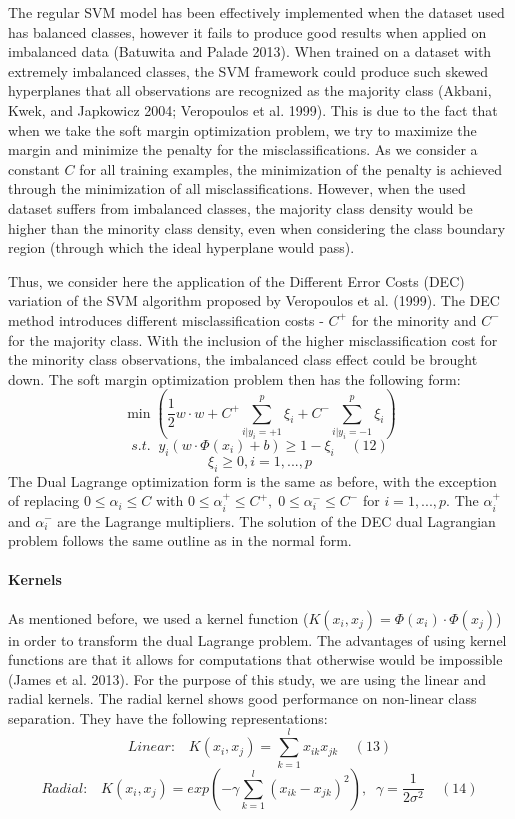 \documentclass[12pt,]{article}
\let\oldparagraph\paragraph
\renewcommand{\paragraph}[1]{\oldparagraph{#1}\mbox{}}
\begin{document}
The regular SVM model has been effectively implemented when the dataset
used has balanced classes, however it fails to produce good results when
applied on imbalanced data (Batuwita and Palade 2013). When trained on a
dataset with extremely imbalanced classes, the SVM framework could
produce such skewed hyperplanes that all observations are recognized as
the majority class (Akbani, Kwek, and Japkowicz 2004; Veropoulos et al.
1999). This is due to the fact that when we take the soft margin
optimization problem, we try to maximize the margin and minimize the
penalty for the misclassifications. As we consider a constant \(C\) for
all training examples, the minimization of the penalty is achieved
through the minimization of all misclassifications. However, when the
used dataset suffers from imbalanced classes, the majority class density
would be higher than the minority class density, even when considering
the class boundary region (through which the ideal hyperplane would
pass).

Thus, we consider here the application of the Different Error Costs
(DEC) variation of the SVM algorithm proposed by Veropoulos et al.
(1999). The DEC method introduces different misclassification costs -
\(C^+\) for the minority and \(C^-\) for the majority class. With the
inclusion of the higher misclassification cost for the minority class
observations, the imbalanced class effect could be brought down. The
soft margin optimization problem then has the following form:
\[\min{(\frac{1}{2}w \cdot w + C^+\sum_{i|y_i=+1}^{p}\xi_i + C^-\sum_{i|y_i=-1}^{p}\xi_i)}\]
\[s.t. \;\; y_i(w \cdot \Phi(x_i) + b) \geq 1 - \xi_i\;\;\;\;(12)\]
\[\xi_i \geq 0, i = 1,...,p\] The Dual Lagrange optimization form is the
same as before, with the exception of replacing \(0 \leq\alpha_i\leq C\)
with \(0 \leq\alpha_i^+\leq C^+, \; 0 \leq\alpha_i^-\leq C^-\) for
\(i=1,...,p\). The \(\alpha_i^+\) and \(\alpha_i^-\) are the Lagrange
multipliers. The solution of the DEC dual Lagrangian problem follows the
same outline as in the normal form.

\hypertarget{kernels}{%
\paragraph{Kernels}\label{kernels}}

As mentioned before, we used a kernel function
(\(K(x_i,x_j) = \Phi(x_i)\cdot \Phi(x_j)\)) in order to transform the
dual Lagrange problem. The advantages of using kernel functions are that
it allows for computations that otherwise would be impossible (James et
al. 2013). For the purpose of this study, we are using the linear and
radial kernels. The radial kernel shows good performance on non-linear
class separation. They have the following representations:
\[Linear: \;\;\; K(x_i,x_j) = \sum_{k=1}^{l}x_{ik}x_{jk}\;\;\;\;(13)\]
\[Radial: \;\;\; K(x_i,x_j) = exp(-\gamma\sum_{k=1}^{l}(x_{ik}-x_{jk})^2), \;\; \gamma=\frac{1}{2\sigma^2}\;\;\;\;(14)\]
\end{document}
